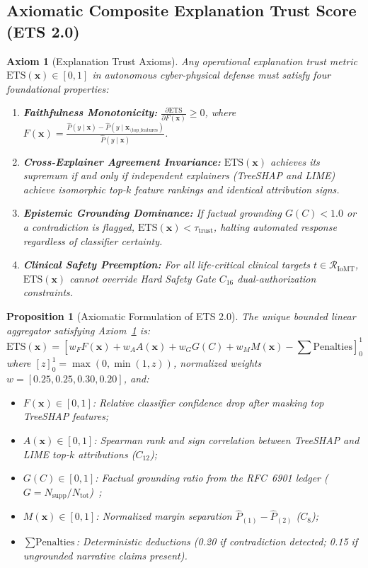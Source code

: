 \documentclass{ieeeaccess}
\newtheorem{axiom}{Axiom}
\newtheorem{proposition}{Proposition}
\begin{document}
\subsection{Axiomatic Composite Explanation Trust Score (ETS 2.0)}
\begin{axiom}[Explanation Trust Axioms]
\label{ax:ets}
Any operational explanation trust metric $\text{ETS}(\mathbf{x}) \in [0, 1]$ in autonomous cyber-physical defense must satisfy four foundational properties:
\begin{enumerate}
    \item \textbf{Faithfulness Monotonicity:} $\frac{\partial \text{ETS}}{\partial F(\mathbf{x})} \ge 0$, where $F(\mathbf{x}) = \frac{\hat{P}(y \mid \mathbf{x}) - \hat{P}(y \mid \mathbf{x}_{\setminus \text{top\_features}})}{\hat{P}(y \mid \mathbf{x})}$.
    \item \textbf{Cross-Explainer Agreement Invariance:} $\text{ETS}(\mathbf{x})$ achieves its supremum if and only if independent explainers (TreeSHAP and LIME) achieve isomorphic top-$k$ feature rankings and identical attribution signs.
    \item \textbf{Epistemic Grounding Dominance:} If factual grounding $G(C) < 1.0$ or a contradiction is flagged, $\text{ETS}(\mathbf{x}) < \tau_{\text{trust}}$, halting automated response regardless of classifier certainty.
    \item \textbf{Clinical Safety Preemption:} For all life-critical clinical targets $t \in \mathcal{R}_{\text{IoMT}}$, $\text{ETS}(\mathbf{x})$ cannot override Hard Safety Gate $C_{16}$ dual-authorization constraints.
\end{enumerate}
\end{axiom}

\begin{proposition}[Axiomatic Formulation of ETS 2.0]
The unique bounded linear aggregator satisfying Axiom~\ref{ax:ets} is:
\begin{equation}
\text{ETS}(\mathbf{x}) = \left[ w_F F(\mathbf{x}) + w_A A(\mathbf{x}) + w_G G(C) + w_M M(\mathbf{x}) - \sum \text{Penalties} \right]_0^1
\end{equation}
where $[z]_0^1 = \max(0, \min(1, z))$, normalized weights $w = [0.25, 0.25, 0.30, 0.20]$, and:
\begin{itemize}
    \item $F(\mathbf{x}) \in [0, 1]$: Relative classifier confidence drop after masking top TreeSHAP features;
    \item $A(\mathbf{x}) \in [0, 1]$: Spearman rank and sign correlation between TreeSHAP and LIME top-$k$ attributions ($C_{12}$);
    \item $G(C) \in [0, 1]$: Factual grounding ratio from the RFC~6901 ledger ($G = N_{\text{supp}} / N_{\text{tot}}$)~\cite{rfc6901};
    \item $M(\mathbf{x}) \in [0, 1]$: Normalized margin separation $\hat{P}_{(1)} - \hat{P}_{(2)}$ ($C_8$);
    \item $\sum \text{Penalties}$: Deterministic deductions (0.20 if contradiction detected; 0.15 if ungrounded narrative claims present).
\end{itemize}
\end{proposition}
\end{document}
